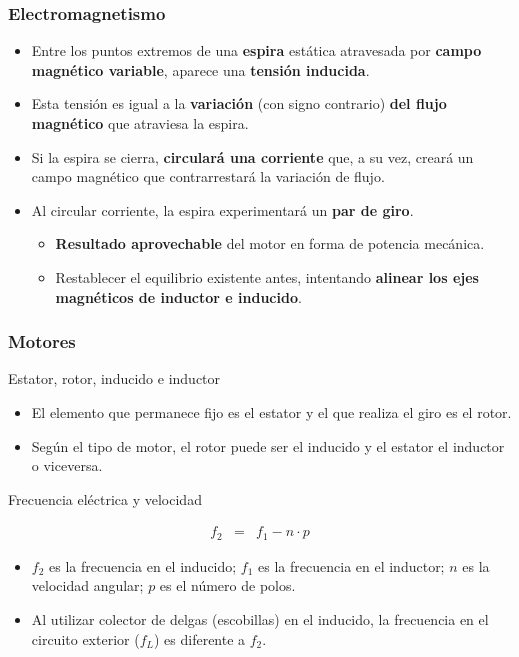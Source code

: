 \documentclass[serif, xcolor=dvipsnames]{beamer}
\begin{document}
\begin{frame}
\frametitle{Electromagnetismo}
\begin{itemize}
\item Entre los puntos extremos de una \textbf{espira} estática atravesada
por \textbf{campo magnético variable}, aparece una \textbf{tensión
inducida}. 
\item Esta tensión es igual a la \textbf{variación} (con signo contrario)
\textbf{del flujo magnético} que atraviesa la espira. 
\item Si la espira se cierra, \textbf{circulará una corriente} que, a su
vez, creará un campo magnético que contrarrestará la variación de
flujo. 
\item Al circular corriente, la espira experimentará un \textbf{par de giro}. 

\begin{itemize}
\item \textbf{Resultado aprovechable} del motor en forma de potencia mecánica. 
\item Restablecer el equilibrio existente antes, intentando \textbf{alinear
los ejes magnéticos de inductor e inducido}. 
\end{itemize}
\end{itemize}

\end{frame}

\begin{frame}[plain]
\frametitle{Motores}
\begin{block}
{Estator, rotor, inducido e inductor}
\begin{itemize}
\item El elemento que permanece fijo es el estator y el que realiza el giro
es el rotor. 
\item Según el tipo de motor, el rotor puede ser el inducido y el estator
el inductor o viceversa. 
\end{itemize}
\end{block}
{}
\begin{block}
{Frecuencia eléctrica y velocidad}

\begin{eqnarray*}
f_{2} & = & f_{1}-n\cdot p\end{eqnarray*}

\begin{itemize}
\item $f_{2}$ es la frecuencia en el inducido; $f_{1}$ es la frecuencia
en el inductor; $n$ es la velocidad angular; $p$ es el número de
polos.
\item Al utilizar colector de delgas (escobillas) en el inducido, la frecuencia
en el circuito exterior ($f_{L}$) es diferente a $f_{2}$.
\end{itemize}
\end{block}

\end{frame}
\end{document}
